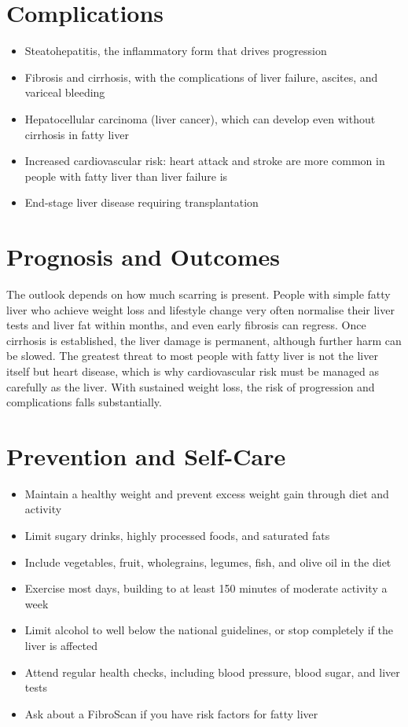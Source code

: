 \section*{Complications}
\begin{itemize}
    \item Steatohepatitis, the inflammatory form that drives progression
    \item Fibrosis and cirrhosis, with the complications of liver failure, ascites, and variceal bleeding
    \item Hepatocellular carcinoma (liver cancer), which can develop even without cirrhosis in fatty liver
    \item Increased cardiovascular risk: heart attack and stroke are more common in people with fatty liver than liver failure is
    \item End-stage liver disease requiring transplantation
\end{itemize}

\section*{Prognosis and Outcomes}
The outlook depends on how much scarring is present. People with simple fatty liver who achieve weight loss and lifestyle change very often normalise their liver tests and liver fat within months, and even early fibrosis can regress. Once cirrhosis is established, the liver damage is permanent, although further harm can be slowed. The greatest threat to most people with fatty liver is not the liver itself but heart disease, which is why cardiovascular risk must be managed as carefully as the liver. With sustained weight loss, the risk of progression and complications falls substantially.

\section*{Prevention and Self-Care}
\begin{itemize}
    \item Maintain a healthy weight and prevent excess weight gain through diet and activity
    \item Limit sugary drinks, highly processed foods, and saturated fats
    \item Include vegetables, fruit, wholegrains, legumes, fish, and olive oil in the diet
    \item Exercise most days, building to at least 150 minutes of moderate activity a week
    \item Limit alcohol to well below the national guidelines, or stop completely if the liver is affected
    \item Attend regular health checks, including blood pressure, blood sugar, and liver tests
    \item Ask about a FibroScan if you have risk factors for fatty liver
\end{itemize}

